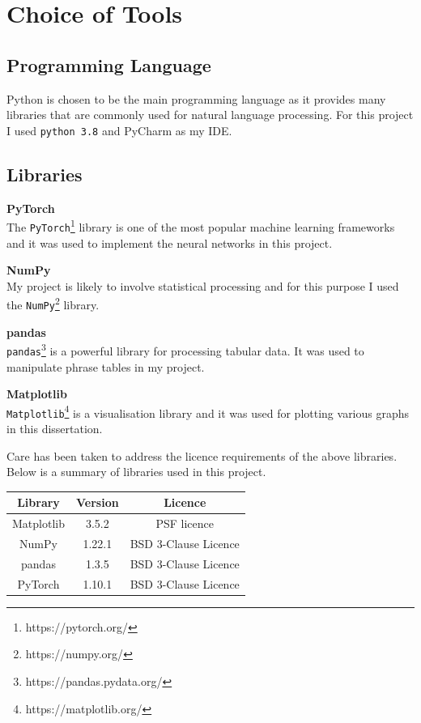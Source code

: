 \documentclass[12pt,a4paper,twoside]{report}
\begin{document}
\section{Choice of Tools}\label{section:tools}

\subsection{Programming Language}
Python is chosen to be the main programming language as it provides many libraries that are commonly used for natural language processing. For this project I used \texttt{python 3.8} and PyCharm as my IDE.

\subsection{Libraries}
\textbf{PyTorch} \\
The \texttt{PyTorch}\footnote{https://pytorch.org/} library is one of the most popular machine learning frameworks and it was used to implement the neural networks in this project.

\textbf{NumPy} \\
My project is likely to involve statistical processing and for this purpose I used the \texttt{NumPy}\footnote{https://numpy.org/} library.

\textbf{pandas} \\
\texttt{pandas}\footnote{https://pandas.pydata.org/} is a powerful library for processing tabular data. It was used to manipulate phrase tables in my project.

\textbf{Matplotlib} \\
\texttt{Matplotlib}\footnote{https://matplotlib.org/} is a visualisation library and it was used for plotting various graphs in this dissertation.

Care has been taken to address the licence requirements of the above libraries. Below is a summary of libraries used in this project.

\begin{center}
\vspace*{3mm}
\begin{tabular}{ c | c | c }
 \textbf{Library} & \textbf{Version} & \textbf{Licence} \\
 \hline
 Matplotlib & 3.5.2 & PSF licence \\
 NumPy & 1.22.1 & BSD 3-Clause Licence \\
 pandas & 1.3.5 & BSD 3-Clause Licence \\
 PyTorch & 1.10.1 & BSD 3-Clause Licence
\end{tabular}
\end{center}
\end{document}
